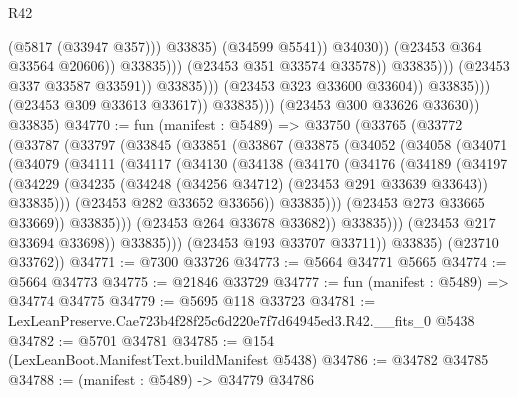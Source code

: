 \begin{lexlean}{R42}
\begin{coremodule}
                                                          (@5817 (@33947 @357)))
                                                        @33835)
                                                      (@34599 @5541))
                                                    @34030))
                                                (@23453 @364 @33564 @20606))
                                              @33835)))
                                        (@23453 @351 @33574 @33578))
                                      @33835)))
                                (@23453 @337 @33587 @33591))
                              @33835)))
                        (@23453 @323 @33600 @33604))
                      @33835)))
                (@23453 @309 @33613 @33617))
              @33835)))
        (@23453 @300 @33626 @33630))
      @33835)
@34770 := fun (manifest : @5489) =>
  @33750
    (@33765
      (@33772
        (@33787
          (@33797
            (@33845
              (@33851
                (@33867
                  (@33875
                    (@34052
                      (@34058
                        (@34071
                          (@34079
                            (@34111
                              (@34117
                                (@34130
                                  (@34138
                                    (@34170
                                      (@34176
                                        (@34189
                                          (@34197
                                            (@34229
                                              (@34235
                                                (@34248 (@34256 @34712) (@23453 @291 @33639 @33643))
                                                @33835)))
                                          (@23453 @282 @33652 @33656))
                                        @33835)))
                                  (@23453 @273 @33665 @33669))
                                @33835)))
                          (@23453 @264 @33678 @33682))
                        @33835)))
                  (@23453 @217 @33694 @33698))
                @33835)))
          (@23453 @193 @33707 @33711))
        @33835)
      (@23710 @33762))
@34771 := @7300 @33726
@34773 := @5664 @34771 @5665
@34774 := @5664 @34773
@34775 := @21846 @33729
@34777 := fun (manifest : @5489) => @34774 @34775
@34779 := @5695 @118 @33723
@34781 := LexLeanPreserve.Cae723b4f28f25c6d220e7f7d64945ed3.R42.__fits_0 @5438
@34782 := @5701 @34781
@34785 := @154 (LexLeanBoot.ManifestText.buildManifest @5438)
@34786 := @34782 @34785
@34788 := (manifest : @5489) -> @34779 @34786

\end{coremodule}
\end{lexlean}
